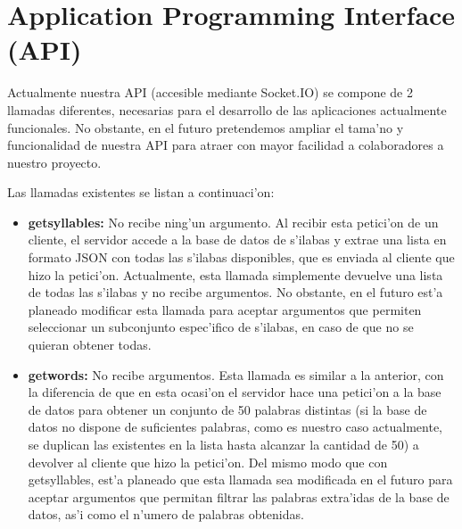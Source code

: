 \section{Application Programming Interface (API)}
\label{sub:application_programming_interface_(api)}

Actualmente nuestra API (accesible mediante Socket.IO) se compone de 2 llamadas diferentes, necesarias para el
desarrollo de las aplicaciones actualmente funcionales. No obstante, en el futuro pretendemos ampliar el tama'no y
funcionalidad de nuestra API para atraer con mayor facilidad a colaboradores a nuestro proyecto.

Las llamadas existentes se listan a continuaci'on:

\begin{itemize}
\item \textbf{getsyllables:} No recibe ning'un argumento. Al recibir esta petici'on de un cliente, el servidor accede
a la base de datos de s'ilabas y extrae una lista en formato JSON con todas las s'ilabas disponibles, que es enviada
al cliente que hizo la petici'on.
Actualmente, esta llamada simplemente devuelve una lista de todas las s'ilabas y no recibe argumentos. No obstante,
en el futuro est'a planeado modificar esta llamada para aceptar argumentos que permiten seleccionar un subconjunto
espec'ifico de s'ilabas, en caso de que no se quieran obtener todas.
\item \textbf{getwords:} No recibe argumentos. Esta llamada es similar a la anterior, con la diferencia de que en
esta ocasi'on el servidor hace una petici'on a la base de datos para obtener un conjunto de 50 palabras distintas (si
la base de datos no dispone de suficientes palabras, como es nuestro caso actualmente, se duplican las existentes en
la lista hasta alcanzar la cantidad de 50) a devolver al cliente que hizo la petici'on.
Del mismo modo que con getsyllables, est'a planeado que esta llamada sea modificada en el futuro para aceptar
argumentos que permitan filtrar las palabras extra'idas de la base de datos, as'i como el n'umero de palabras
obtenidas.
\end{itemize}
